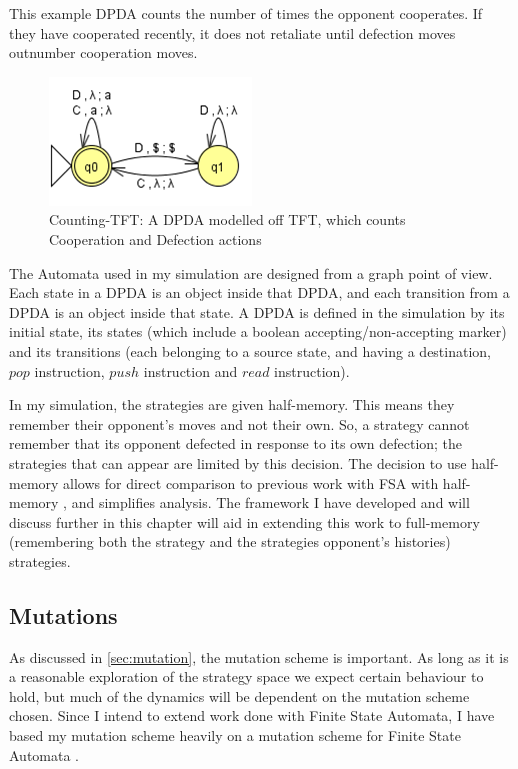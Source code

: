 \documentclass[a4paper,11pt,bcshonoursthesis,singlespace,oneside,thesisdraft,pdflatex]{cssethesis}
\begin{document}
This example DPDA counts the number of times the opponent cooperates. 
If they have cooperated recently, it does not retaliate until defection moves outnumber cooperation moves. 
\begin{figure}[h]
\centering
\includegraphics[scale=0.6]{pdatft}
\caption{Counting-TFT: A DPDA modelled off TFT, which counts Cooperation and Defection actions}
\label{fig:dpda}
\end{figure}
The Automata used in my simulation are designed from a graph point of view. 
Each state in a DPDA is an object inside that DPDA, and each transition from a DPDA is an object inside that state. 
A DPDA is defined in the simulation by its initial state, its states (which include a boolean accepting/non-accepting marker) and its transitions (each belonging to a source state, and having a destination, $pop$ instruction, $push$ instruction and $read$ instruction). 

In my simulation, the strategies are given half-memory. 
This means they remember their opponent's moves and not their own. 
So, a strategy cannot remember that its opponent defected in response to its own defection; the strategies that can appear are limited by this decision. 
The decision to use half-memory allows for direct comparison to previous work with FSA with half-memory \citep{van-veelen:PNAS:2012}, and simplifies analysis. 
The framework I have developed and will discuss further in this chapter will aid in extending this work to full-memory (remembering both the strategy and the strategies opponent's histories) strategies. 

\subsection{Mutations}
As discussed in \ref{sec:mutation}, the mutation scheme is important. As long as it is a reasonable exploration of the strategy space we expect certain behaviour to hold, but much of the dynamics will be dependent on the mutation scheme chosen. Since I intend to extend work done with Finite State Automata, I have based my mutation scheme heavily on a mutation scheme for Finite State Automata \citep{van-veelen:PNAS:2012}.
\end{document}
